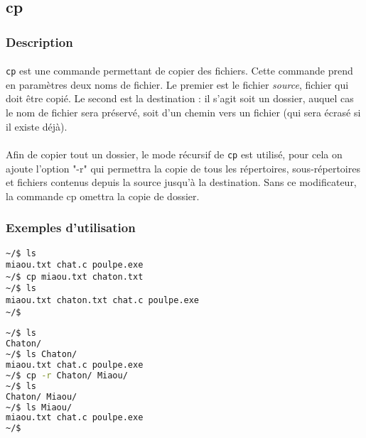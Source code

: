\subsection{cp}

\subsubsection*{Description}

\paragraph{} \texttt{cp} est une commande permettant de copier des fichiers.
Cette commande prend en paramètres deux noms de fichier. Le premier est le
fichier \emph{source}, fichier qui doit être copié. Le second est la
destination : il s'agit soit un dossier, auquel cas le nom de fichier sera
préservé, soit d'un chemin vers un fichier (qui sera écrasé si il existe
déjà).

\paragraph{} Afin de copier tout un dossier, le mode récursif de \texttt{cp}
est utilisé, pour cela on ajoute l'option "-r" qui permettra la copie de tous
les répertoires, sous-répertoires et fichiers contenus depuis la source jusqu'à
la destination.  Sans ce modificateur, la commande cp omettra la copie de
dossier.

\subsubsection*{Exemples d'utilisation}

\begin{lstlisting}[caption=copie de fichier]
~/$ ls
miaou.txt chat.c poulpe.exe
~/$ cp miaou.txt chaton.txt
~/$ ls
miaou.txt chaton.txt chat.c poulpe.exe
~/$
\end{lstlisting}

\begin{lstlisting}[language=bash,caption=copie de dossier]
~/$ ls
Chaton/
~/$ ls Chaton/
miaou.txt chat.c poulpe.exe
~/$ cp -r Chaton/ Miaou/
~/$ ls
Chaton/ Miaou/
~/$ ls Miaou/
miaou.txt chat.c poulpe.exe
~/$
\end{lstlisting}
